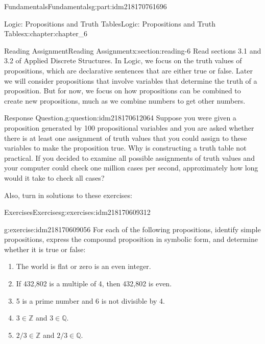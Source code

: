 \documentclass[oneside,10pt,]{book}
\numberwithin{equation}{section}
\begin{document}
\begin{partptx}{Fundamentals}{}{Fundamentals}{}{}{g:part:idm218170761696}
\begin{chapterptx}{Logic: Propositions and Truth Tables}{}{Logic: Propositions and Truth Tables}{}{}{x:chapter:chapter_6}
\typeout{************************************************}
\typeout{************************************************}
%
\begin{sectionptx}{Reading Assignment}{}{Reading Assignment}{}{}{x:section:reading-6}
Read sections 3.1 and 3.2 of Applied Discrete Structures.  In Logic, we focus on the truth values of propositions, which are declarative sentences that are either true or false.  Later we will consider propositions that involve variables that determine the truth of a proposition. But for now, we focus on how propositions can be combined to create new propositions, much as we combine numbers to get other numbers.%
\begin{question}{Response Question.}{g:question:idm218170612064}%
Suppose you were given a proposition generated by 100 propositional variables and you are asked whether there is at least one assignment of truth values that you could assign to these variables to make the proposition true. Why is constructing a truth table not practical.  If you decided to examine all possible assignments of truth values and your computer could check one million cases per second, approximately how long would it take to check all cases?%
\end{question}
Also, turn in solutions to these exercises:%
%
%
\typeout{************************************************}
\typeout{************************************************}
%
\begin{exercises-subsection-numberless}{Exercises}{}{Exercises}{}{}{g:exercises:idm218170609312}
\par\medskip\noindent%
%
\begin{exercisegroup}
\begin{divisionexerciseeg}{1}{}{}{g:exercise:idm218170609056}%
For each of the following propositions, identify simple propositions, express the compound proposition in symbolic form, and determine whether it is true or false:%
\par
%
\begin{enumerate}[label=(\alph*)]
\item{}The world is flat or zero is an even integer.%
\item{}If 432,802 is a multiple of 4, then 432,802 is even.%
\item{}5 is a prime number and 6 is not divisible by 4.%
\item{}\(3 \in \mathbb{Z}\) and \(3 \in  \mathbb{Q}\).%
\item{}\(2/3 \in  \mathbb{Z}\) and \(2/3 \in  \mathbb{Q}\).%

\end{enumerate}
\end{divisionexerciseeg}
\end{exercisegroup}
\end{exercises-subsection-numberless}
\end{sectionptx}
\end{chapterptx}
\end{partptx}
\end{document}
